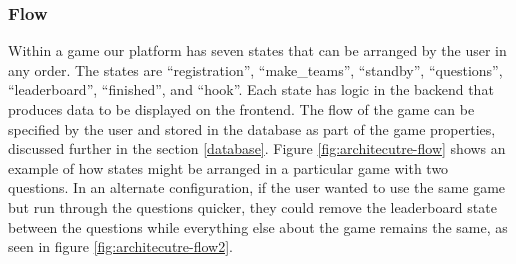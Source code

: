 \documentclass{article}
\begin{document}
        \subsubsection{Flow}\label{flow}
	        Within a game our platform has seven states that can be arranged by the user in any order. The states are ``registration'', ``make\_teams'', ``standby'', ``questions'', ``leaderboard'', ``finished'', and ``hook''. Each state has logic in the backend that produces data to be displayed on the frontend. The flow of the game can be specified by the user and stored in the database as part of the game properties, discussed further in the  section \ref{database}. Figure \ref{fig:architecutre-flow} shows an example of how states might be arranged in a particular game with two questions. In an alternate configuration, if the user wanted to use the same game but run through the questions quicker, they could remove the leaderboard state between the questions while everything else about the game remains the same, as seen in figure \ref{fig:architecutre-flow2}.
\end{document}
